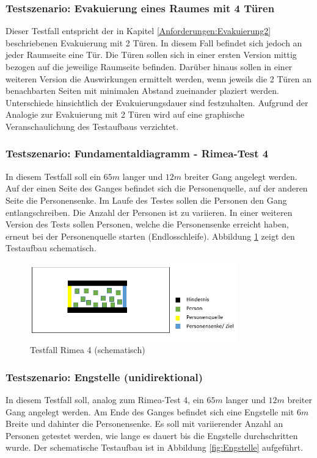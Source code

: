 \subsubsection{Testszenario: Evakuierung eines Raumes mit 4 Türen}
Dieser Testfall entspricht der in Kapitel \ref{Anforderungen:Evakuierung2} beschriebenen Evakuierung mit 2 Türen. In diesem Fall befindet sich jedoch an jeder Raumseite eine Tür. Die Türen sollen sich in einer ersten Version mittig bezogen auf die jeweilige Raumseite befinden. Darüber hinaus sollen in einer weiteren Version die Auswirkungen ermittelt werden, wenn jeweils die 2 Türen an benachbarten Seiten mit minimalen Abstand zueinander plaziert werden. Unterschiede hinsichtlich der Evakuierungsdauer sind festzuhalten. Aufgrund der Analogie zur Evakuierung mit 2 Türen wird auf eine graphische Veranschaulichung des Testaufbaus verzichtet.

\subsubsection{Testszenario: Fundamentaldiagramm - Rimea-Test 4}
\label{Anforderungen:RimeaTest}
In diesem Testfall soll ein $65m$ langer und $12m$ breiter Gang angelegt werden. Auf der einen Seite des Ganges befindet sich die Personenquelle, auf der anderen Seite die Personensenke. Im Laufe des Testes sollen die Personen den Gang entlangschreiben. Die Anzahl der Personen ist zu variieren. In einer weiteren Version des Tests sollen Personen, welche die Personensenke erreicht haben, erneut bei der Personenquelle starten (Endlosschleife). Abbildung \ref{fig:Test_Rimea4} zeigt den Testaufbau schematisch.

\begin{figure}[htpb]
	\centering
	\includegraphics[width=0.8\textwidth]{abbildungen/Test_Rimea4-2.png}
	\caption{Testfall Rimea 4 (schematisch)}
	\label{fig:Test_Rimea4}
\end{figure}

\subsubsection{Testszenario: Engstelle (unidirektional)}
In diesem Testfall soll, analog zum Rimea-Test 4, ein $65m$ langer und $12m$ breiter Gang angelegt werden. Am Ende des Ganges befindet sich eine Engstelle mit $6m$ Breite und dahinter die Personensenke. Es soll mit variierender Anzahl an Personen getestet werden, wie lange es dauert bis die Engstelle durchschritten wurde. Der schematische Testaufbau ist in Abbildung \ref{fig:Engstelle} aufgeführt.

